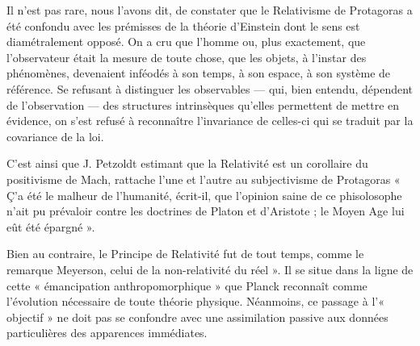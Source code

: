Il n’est pas rare, nous l’avons dit, de constater que le Relativisme de
Protagoras a été confondu avec les prémisses de la théorie d’Einstein
dont le sens est diamétralement opposé. On a cru que l’homme ou, plus
exactement, que l’observateur était la mesure de toute chose, que les
objets, à l’instar des phénomènes, devenaient inféodés à son temps, à son
espace, à son système de référence. Se refusant à distinguer les observables
— qui, bien entendu, dépendent de l’observation — des structures intrinsèques
qu’elles permettent de mettre en évidence, on s’est refusé à reconnaître
l’invariance de celles-ci qui se traduit par la covariance de la loi.

C’est ainsi que J. Petzoldt
estimant que la Relativité est un corollaire
du positivisme de Mach, rattache l’une et l’autre au subjectivisme de
Protagoras « Ç’a été le malheur de l’humanité, écrit-il, que l'opinion saine
de ce phisolosophe n’ait pu prévaloir contre les doctrines de Platon et
d’Aristote ; le Moyen Age lui eût été épargné ».

Bien au contraire, le Principe de Relativité fut de tout temps, comme
le remarque Meyerson,
celui de la non-relativité du réel ». Il se situe
dans la ligne de cette « émancipation anthropomorphique » que Planck
reconnaît comme l’évolution nécessaire de toute théorie physique.
Néanmoins, ce passage à l’« objectif » ne doit pas se confondre avec une
assimilation passive aux données particulières des apparences immédiates.


